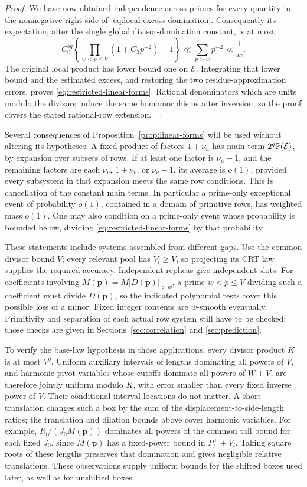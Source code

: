 \begin{proof}
We have now obtained independence across primes for every quantity
in the nonnegative right side of
\eqref{eq:local-excess-domination}.  Consequently its expectation,
after the single global divisor-domination constant, is at most
\[
 C_0^{bq}\left\{\prod_{w<p\le V}(1+C_3p^{-2})-1\right\}
 \ll\sum_{p>w}p^{-2}\ll\frac1w.
\]
The original local product has lower bound one on
\(\mathcal E\).  Integrating that lower bound and the estimated
excess, and restoring the two residue-approximation errors, proves
\eqref{eq:restricted-linear-forms}.  Rational denominators which
are units modulo the divisors induce the same homomorphisms after
inversion, so the proof covers the stated rational-row extension.
\end{proof}

Several consequences of Proposition~\ref{prop:linear-forms} will be
used without altering its hypotheses.  A fixed product of factors
\(1+\nu_u\) has main term \(2^q\mathbb P(\mathcal E)\), by expansion
over subsets of rows.  If at least one factor is \(\nu_u-1\),
and the remaining factors are each \(\nu_v\), \(1+\nu_v\),
or \(\nu_v-1\), its average is \(o(1)\), provided every
subsystem in that expansion meets the same row conditions.  This
is cancellation of the constant main terms.  In particular a
prime-only exceptional event of probability \(o(1)\), contained
in a domain of primitive rows, has weighted mass \(o(1)\).
One may also condition on a prime-only event whose probability is
bounded below, dividing \eqref{eq:restricted-linear-forms} by that
probability.

These statements include systems assembled from different gaps.
Use the common divisor bound \(V\); every relevant pool has
\(V_l\ge V\), so projecting its CRT law supplies the required
accuracy.  Independent replicas give independent slots.  For
coefficients involving
\(M(\boldsymbol p)=M|D(\boldsymbol p)|_{>w}\), a prime
\(w<p\le V\) dividing such a coefficient must divide
\(D(\boldsymbol p)\), so the indicated polynomial tests cover
this possible loss of a minor.  Fixed integer contents are
\(w\)-smooth eventually.  Primitivity and separation of each
actual row system still have to be checked; those checks are given
in Sections~\ref{sec:correlation} and \ref{sec:prediction}.

To verify the base-law hypothesis in those applications, every
divisor product \(K\) is at most \(V^q\).  Uniform auxiliary
intervals of lengths dominating all powers of \(V\), and harmonic
pivot variables whose cutoffs dominate all powers of \(W+V\),
are therefore jointly uniform modulo \(K\), with error smaller
than every fixed inverse power of \(V\).  Their conditional
interval locations do not matter.  A short translation changes
such a box by the sum of the displacement-to-side-length ratios;
the translation and dilation bounds above cover harmonic variables.
For example,
\(R_l/(J_0M(\boldsymbol p))\) dominates all powers of the common
tail bound for each fixed \(J_0\), since
\(M(\boldsymbol p)\) has a fixed-power bound in \(P_l^++V_l\).
Taking square roots of these lengths preserves that domination and
gives negligible relative translations.  These observations supply
uniform bounds for the shifted boxes used later, as well as for
unshifted boxes.
